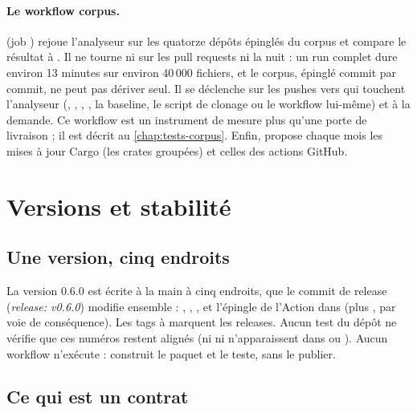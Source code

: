\paragraph{Le workflow corpus.}  (job ) rejoue l'analyseur sur les quatorze dépôts épinglés du corpus et compare le résultat à . Il ne tourne ni sur les pull requests ni la nuit : un run complet dure environ 13 minutes sur environ 40\,000 fichiers, et le corpus, épinglé commit par commit, ne peut pas dériver seul. Il se déclenche sur les pushes vers  qui touchent l'analyseur (, , , , la baseline, le script de clonage ou le workflow lui-même) et à la demande. Ce workflow est un instrument de mesure plus qu'une porte de livraison ; il est décrit au \cref{chap:tests-corpus}. Enfin,  propose chaque mois les mises à jour Cargo (les crates  groupées) et celles des actions GitHub.

\section{Versions et stabilité}
\label{sec:distribution-versions}

\subsection{Une version, cinq endroits}

La version 0.6.0 est écrite à la main à cinq endroits, que le commit de release  (\og \emph{release: v0.6.0}\fg{}) modifie ensemble : , , ,  et l'épingle de l'Action dans  (plus , par voie de conséquence). Les tags  à  marquent les releases. Aucun test du dépôt ne vérifie que ces numéros restent alignés (ni  ni  n'apparaissent dans  ou ). Aucun workflow n'exécute  :  construit le paquet et le teste, sans le publier.

\subsection{Ce qui est un contrat}

